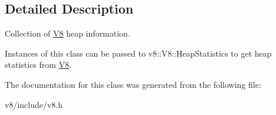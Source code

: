 \subsection{Detailed Description}
Collection of \hyperlink{classv8_1_1V8}{V8} heap information.

Instances of this class can be passed to v8\+::\+V8\+::\+Heap\+Statistics to get heap statistics from \hyperlink{classv8_1_1V8}{V8}. 

The documentation for this class was generated from the following file\+:\begin{DoxyCompactItemize}
\item 
v8/include/v8.\+h\end{DoxyCompactItemize}

